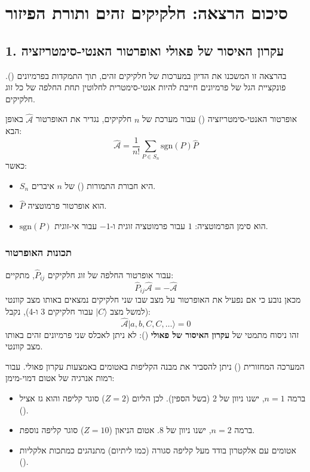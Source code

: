 \section*{סיכום הרצאה: חלקיקים זהים ותורת הפיזור}

\subsection*{1. עקרון האיסור של פאולי ואופרטור האנטי-סימטריזציה}

בהרצאה זו המשכנו את הדיון במערכות של חלקיקים זהים, תוך התמקדות בפרמיונים (). פונקציית הגל של פרמיונים חייבת להיות אנטי-סימטרית לחלוטין תחת החלפה של כל זוג חלקיקים.

\begin{definitionbox}{אופרטור האנטי-סימטריזציה ()}
עבור מערכת של $n$ חלקיקים, נגדיר את האופרטור $\hat{\mathcal{A}}$ באופן הבא:
$$\hat{\mathcal{A}} = \frac{1}{n!} \sum_{P \in S_n} \text{sgn}(P) \hat{P}$$
כאשר:
\begin{itemize}
    \item $S_n$ היא חבורת התמורות () של $n$ איברים.
    \item $\hat{P}$ הוא אופרטור פרמוטציה.
    \item $\text{sgn}(P)$ הוא סימן הפרמוטציה: $1$ עבור פרמוטציה זוגית ו-$-1$ עבור אי-זוגית.
\end{itemize}
\end{definitionbox}

\subsubsection*{תכונות האופרטור}
עבור אופרטור החלפה של זוג חלקיקים $\hat{P}_{ij}$, מתקיים:
$$\hat{P}_{ij} \hat{\mathcal{A}} = -\hat{\mathcal{A}}$$
מכאן נובע כי אם נפעיל את האופרטור על מצב שבו שני חלקיקים נמצאים באותו מצב קוונטי (למשל מצב $|C\rangle$ עבור חלקיקים 3 ו-4), נקבל:
$$\hat{\mathcal{A}} |a, b, C, C, \dots\rangle = 0$$
זהו ניסוח מתמטי של \textbf{עקרון האיסור של פאולי} (): לא ניתן לאכלס שני פרמיונים זהים באותו מצב קוונטי.

\begin{examplebox}{המערכה המחזורית ()}
ניתן להסביר את מבנה הקליפות באטומים באמצעות עקרון פאולי. עבור רמות אנרגיה של אטום דמוי-מימן:
\begin{itemize}
    \item ברמה $n=1$, ישנו ניוון של 2 (בשל הספין). לכן הליום ($Z=2$) סוגר קליפה והוא גז אציל ().
    \item ברמה $n=2$, ישנו ניוון של 8. אטום הניאון ($Z=10$) סוגר קליפה נוספת.
    \item אטומים עם אלקטרון בודד מעל קליפה סגורה (כמו ליתיום) מתנהגים כמתכות אלקליות ().
\end{itemize}
\end{examplebox}

